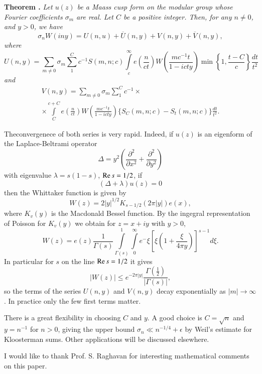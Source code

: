 \medskip
\noindent
{\bfseries Theorem .\label{art6-thm3}}
\textit{Let $u(z)$ be a Maass cusp form on the modular group whose Fourier coefficients $\sigma_m$ are real. Let $C$ be a positive integer. Then, for any $n\neq 0$, and $y>0$, we have}
$$
\sigma_n W (iny) = U (n,u) + \overline{U} (n,y) + V (n,y) + \overline{V} (n,y),
$$
\textit{where}
{\fontsize{10}{12}\selectfont
$$
U(n,y) = \sum\limits_{m\neq 0} \sigma_m \sum\limits^C_1 c^{-1} S (m, n;c) \int\limits^\infty_c e \left(\frac{n}{ct} \right) W \left(\frac{mc^{-1}t}{1-icty} \right) \min
\left\{1, \frac{t-C}{c} \right\} \frac{dt}{t^2}
$$}
\textit{and} 
\begin{multline*}
V (n,y) = \sum\limits_{m \neq 0} \sigma_m  \sum\limits^C_1 c^{-1} \times \\
\times \int\limits^{c+ C}_C e \left(\frac{n}{ct} \right) W \left(\frac{mc^{-1}t}{1-icty} \right) \{S_C (m,n;c) - S_t (m,n;c)\} \frac{dt}{t^2}.
\end{multline*}

\begin{remarks*}
The\pageoriginale convergenece of both series is very rapid. Indeed, if $u(z)$ is an eigenform of the Laplace-Beltrami operator 
$$
\Delta = y^2 \left(\frac{\partial^2}{\partial x^2} + \frac{\partial^2}{\partial y^2} \right)
$$
with eigenvalue $\lambda = s(1-s)$, $\operatorname{Re} s = 1/2$, \ie if
$$
(\Delta + \lambda) u (z) =0
$$
then the Whittaker function is given by 
$$
W(z)  = 2 |y|^{1/2} K_{s-1/2} (2\pi|y|) e (x),
$$
where $K_v (y)$ is the Macdonald Bessel function. By the ingegral representation of Poisson for $K_v(y)$ we obtain for $z = x + iy$ with $y>0$,
$$
W (z) = e (z) \frac{1}{\Gamma(s)} \int\limits^1_{\Gamma (s)} \int\limits^\infty_0 e^{-} \xi \left[\xi \left(1+ \frac{\xi}{4 \pi y} \right) \right]^{s-1} d \xi.
$$
In particular for $s$ on the line $\operatorname{Re} s = 1/2$ it gives
$$
|W(z)| \leqslant e^{-2 \pi |y|} \frac{\Gamma (\frac{1}{2})}{|\Gamma (s)|},
$$
so the terms of the series $U(n,y)$ and $V(n,y)$ decay exponentially as $|m| \to \infty$. In practice only the few first terms matter.

There is a great flexibility in choosing $C$ and $y$. A good choice is $C = \sqrt{n}$ and $y = n^{-1}$ for $n >0$, giving the upper bound $\sigma_n \ll n^{-1/4}+ \epsilon$ by Weil's estimate for Kloosterman sums. Other applications will be discussed elsewhere.

I would like to thank Prof. S. Raghavan for interesting mathematical comments on this paper.
\end{remarks*}

